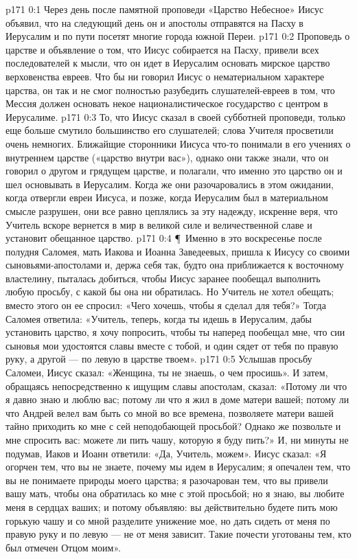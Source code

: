 \author{Комиссия срединников}
\vs p171 0:1 Через день после памятной проповеди «Царство Небесное» Иисус объявил, что на следующий день он и апостолы отправятся на Пасху в Иерусалим и по пути посетят многие города южной Переи.
\vs p171 0:2 Проповедь о царстве и объявление о том, что Иисус собирается на Пасху, привели всех последователей к мысли, что он идет в Иерусалим основать мирское царство верховенства евреев. Что бы ни говорил Иисус о нематериальном характере царства, он так и не смог полностью разубедить слушателей\hyp{}евреев в том, что Мессия должен основать некое националистическое государство с центром в Иерусалиме.
\vs p171 0:3 То, что Иисус сказал в своей субботней проповеди, только еще больше смутило большинство его слушателей; слова Учителя просветили очень немногих. Ближайщие сторонники Иисуса что\hyp{}то понимали в его учениях о внутреннем царстве («царство внутри вас»), однако они также знали, что он говорил о другом и грядущем царстве, и полагали, что именно это царство он и шел основывать в Иерусалим. Когда же они разочаровались в этом ожидании, когда отвергли евреи Иисуса, и позже, когда Иерусалим был в материальном смысле разрушен, они все равно цеплялись за эту надежду, искренне веря, что Учитель вскоре вернется в мир в великой силе и величественной славе и установит обещанное царство.
\vs p171 0:4 \P\ Именно в это воскресенье после полудня Саломея, мать Иакова и Иоанна Заведеевых, пришла к Иисусу со своими сыновьями\hyp{}апостолами и, держа себя так, будто она приближается к восточному властелину, пыталась добиться, чтобы Иисус заранее пообещал выполнить любую просьбу, с какой бы она ни обратилась. Но Учитель не хотел обещать; вместо этого он ее спросил: «Чего хочешь, чтобы я сделал для тебя?» Тогда Саломея ответила: «Учитель, теперь, когда ты идешь в Иерусалим, дабы установить царство, я хочу попросить, чтобы ты наперед пообещал мне, что сии сыновья мои удостоятся славы вместе с тобой, и один сядет от тебя по правую руку, а другой --- по левую в царстве твоем».
\vs p171 0:5 Услышав просьбу Саломеи, Иисус сказал: «Женщина, ты не знаешь, о чем просишь». И затем, обращаясь непосредственно к ищущим славы апостолам, сказал: «Потому ли что я давно знаю и люблю вас; потому ли что я жил в доме матери вашей; потому ли что Андрей велел вам быть со мной во все времена, позволяете матери вашей тайно приходить ко мне с сей неподобающей просьбой? Однако же позвольте и мне спросить вас: можете ли пить чашу, которую я буду пить?» И, ни минуты не подумав, Иаков и Иоанн ответили: «Да, Учитель, можем». Иисус сказал: «Я огорчен тем, что вы не знаете, почему мы идем в Иерусалим; я опечален тем, что вы не понимаете природы моего царства; я разочарован тем, что вы привели вашу мать, чтобы она обратилась ко мне с этой просьбой; но я знаю, вы любите меня в сердцах ваших; и потому объявляю: вы действительно будете пить мою горькую чашу и со мной разделите унижение мое, но дать сидеть от меня по правую руку и по левую --- не от меня зависит. Такие почести уготованы тем, кто был отмечен Отцом моим».
